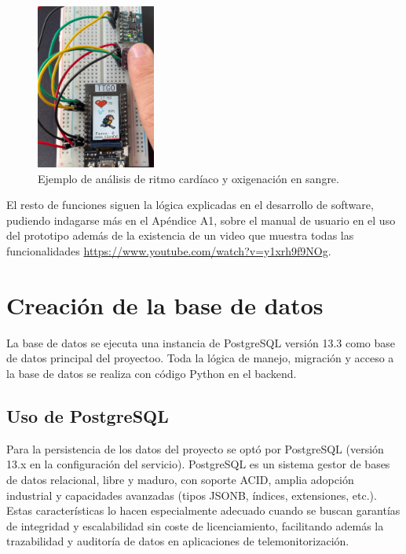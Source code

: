 \documentclass[12pt, a4paper]{article}
\begin{document}
	\begin{figure}[htbp]
		\centering
		\includegraphics[width=0.35\textwidth]{images/analizando.jpg}
		\caption[Ejemplo]{Ejemplo de análisis de ritmo cardíaco y oxigenación en sangre.}
		\label{fig:sangre}
	\end{figure}
	
	El resto de funciones siguen la lógica explicadas en el desarrollo de software, pudiendo indagarse más en el Apéndice A1, sobre el manual de usuario en el uso del prototipo además de la existencia de un video que muestra todas las funcionalidades 	\url{https://www.youtube.com/watch?v=y1xrh9f9NOg}.
	


\section{Creación de la base de datos}


La base de datos se ejecuta una instancia de PostgreSQL versión 13.3 como base de datos principal del proyectoo. Toda la lógica de manejo, migración y acceso a la base de datos se realiza con código Python en el backend.



\subsection{Uso de PostgreSQL}

Para la persistencia de los datos del proyecto se optó por PostgreSQL (versión 13.x en la configuración del servicio). PostgreSQL es un sistema gestor de bases de datos relacional, libre y maduro, con soporte ACID, amplia adopción industrial y capacidades avanzadas (tipos JSONB, índices, extensiones, etc.). Estas características lo hacen especialmente adecuado cuando se buscan garantías de integridad y escalabilidad sin coste de licenciamiento, facilitando además la trazabilidad y auditoría de datos en aplicaciones de telemonitorización. \cite{postgresql_doc,postgresql_13}
\end{document}
